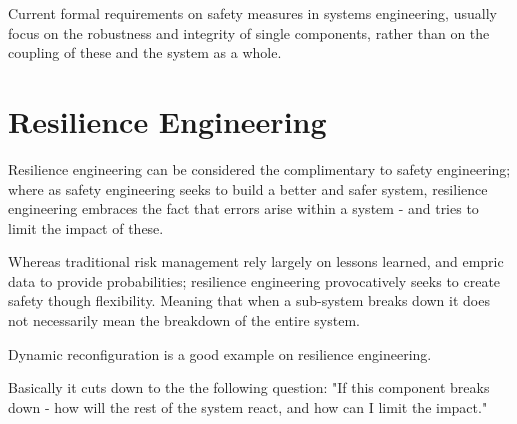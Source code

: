 Current formal requirements on safety measures in systems engineering, usually focus on the robustness and integrity of single components, rather than on the coupling of these and the system as a whole.
\section{Resilience Engineering}
\label{sec:resilience_engineering}
Resilience engineering can be considered the complimentary to safety engineering; where as safety engineering seeks to build a better and safer system, resilience engineering embraces the fact that errors arise within a system - and tries to limit the impact of these.

Whereas traditional risk management rely largely on lessons learned, and empric data to provide probabilities; resilience engineering provocatively seeks to create safety though flexibility. Meaning that when a sub-system breaks down it does not necessarily mean the breakdown of the entire system.

Dynamic reconfiguration is a good example on resilience engineering.

Basically it cuts down to the the following question: "If this component breaks down - how will the rest of the system react, and how can I limit the impact."



